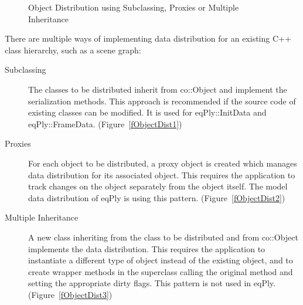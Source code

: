 \documentclass[10pt,a4]{scrartcl}
\newcommand{\fig}[1]{Figure~\ref{#1}}
\begin{document}
\begin{figure}[h!t]
  \hfil
  \hfil
  {\caption{\label{fObjectDist}Object Distribution using Subclassing,
      Proxies or Multiple Inheritance}}
\end{figure}

There are multiple ways of implementing data distribution for an
existing C++ class hierarchy, such as a scene graph:
\begin{description}
\item[Subclassing] The classes to be distributed inherit from
  \textsf{co::Object} and implement the serialization methods. This approach is
  recommended if the source code of existing classes can be modified. It is used
  for \textsf{eqPly::InitData} and
  \textsf{eqPly::FrameData}. (\fig{fObjectDist1})
\item[Proxies] For each object to be distributed, a proxy object is
  created which manages data distribution for its associated
  object. This requires the application to track changes on the object
  separately from the object itself. The model data distribution of
  eqPly is using this pattern. (\fig{fObjectDist2})
\item[Multiple Inheritance] A new class inheriting from the class to be
  distributed and from \textsf{co::Object} implements the data
  distribution. This requires the application to instantiate a different type of
  object instead of the existing object, and to create wrapper methods in the
  superclass calling the original method and setting the appropriate dirty
  flags. This pattern is not used in eqPly. (\fig{fObjectDist3})
\end{description}
\end{document}
